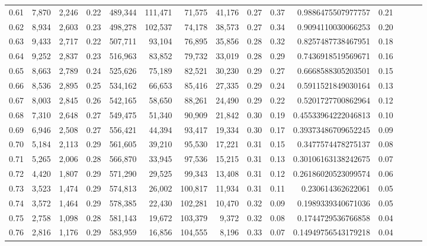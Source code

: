 \begin{tabular}{rrrrrrrrrrrrrrr}
0.61 &   7,870 &  2,246 &  0.22 &  489,344 &  111,471 &   71,575 &   41,176 &  0.27 &  0.37 &      0.9886475507977757 &      0.21 \\
0.62 &   8,934 &  2,603 &  0.23 &  498,278 &  102,537 &   74,178 &   38,573 &  0.27 &  0.34 &      0.9094110030066253 &      0.20 \\
0.63 &   9,433 &  2,717 &  0.22 &  507,711 &   93,104 &   76,895 &   35,856 &  0.28 &  0.32 &      0.8257487738467951 &      0.18 \\
0.64 &   9,252 &  2,837 &  0.23 &  516,963 &   83,852 &   79,732 &   33,019 &  0.28 &  0.29 &      0.7436918519569671 &      0.16 \\
0.65 &   8,663 &  2,789 &  0.24 &  525,626 &   75,189 &   82,521 &   30,230 &  0.29 &  0.27 &      0.6668588305203501 &      0.15 \\
0.66 &   8,536 &  2,895 &  0.25 &  534,162 &   66,653 &   85,416 &   27,335 &  0.29 &  0.24 &      0.5911521849030164 &      0.13 \\
0.67 &   8,003 &  2,845 &  0.26 &  542,165 &   58,650 &   88,261 &   24,490 &  0.29 &  0.22 &      0.5201727700862964 &      0.12 \\
0.68 &   7,310 &  2,648 &  0.27 &  549,475 &   51,340 &   90,909 &   21,842 &  0.30 &  0.19 &     0.45533964222046813 &      0.10 \\
0.69 &   6,946 &  2,508 &  0.27 &  556,421 &   44,394 &   93,417 &   19,334 &  0.30 &  0.17 &     0.39373486709652245 &      0.09 \\
0.70 &   5,184 &  2,113 &  0.29 &  561,605 &   39,210 &   95,530 &   17,221 &  0.31 &  0.15 &      0.3477574478275137 &      0.08 \\
0.71 &   5,265 &  2,006 &  0.28 &  566,870 &   33,945 &   97,536 &   15,215 &  0.31 &  0.13 &     0.30106163138242675 &      0.07 \\
0.72 &   4,420 &  1,807 &  0.29 &  571,290 &   29,525 &   99,343 &   13,408 &  0.31 &  0.12 &     0.26186020523099574 &      0.06 \\
0.73 &   3,523 &  1,474 &  0.29 &  574,813 &   26,002 &  100,817 &   11,934 &  0.31 &  0.11 &       0.230614362622061 &      0.05 \\
0.74 &   3,572 &  1,464 &  0.29 &  578,385 &   22,430 &  102,281 &   10,470 &  0.32 &  0.09 &      0.1989339340671036 &      0.05 \\
0.75 &   2,758 &  1,098 &  0.28 &  581,143 &   19,672 &  103,379 &    9,372 &  0.32 &  0.08 &      0.1744729536766858 &      0.04 \\
0.76 &   2,816 &  1,176 &  0.29 &  583,959 &   16,856 &  104,555 &    8,196 &  0.33 &  0.07 &     0.14949756543179218 &      0.04 \\

\end{tabular}
